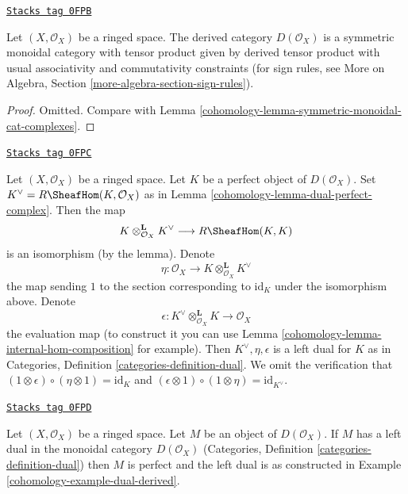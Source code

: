 \begin{lemma}
\label{cohomology-lemma-symmetric-monoidal-derived}
\href{https://stacks.math.columbia.edu/tag/0FPB}{\texttt{Stacks tag 0FPB}}

Let $(X, \mathcal{O}_X)$ be a ringed space. The derived category
$D(\mathcal{O}_X)$ is a symmetric monoidal category with tensor product
given by derived tensor product with usual associativity and
commutativity constraints (for sign rules, see
More on Algebra, Section \ref{more-algebra-section-sign-rules}).
\end{lemma}

\begin{proof}

Omitted. Compare with Lemma \ref{cohomology-lemma-symmetric-monoidal-cat-complexes}.
\end{proof}

\begin{example}
\label{cohomology-example-dual-derived}
\href{https://stacks.math.columbia.edu/tag/0FPC}{\texttt{Stacks tag 0FPC}}

Let $(X, \mathcal{O}_X)$ be a ringed space. Let $K$ be a perfect object
of $D(\mathcal{O}_X)$. Set $K^\vee = R\SheafHom(K, \mathcal{O}_X)$
as in Lemma \ref{cohomology-lemma-dual-perfect-complex}.
Then the map
$$
K \otimes_{\mathcal{O}_X}^\mathbf{L} K^\vee \longrightarrow R\SheafHom(K, K)
$$
is an isomorphism (by the lemma). Denote
$$
\eta :
\mathcal{O}_X
\longrightarrow
K \otimes_{\mathcal{O}_X}^\mathbf{L} K^\vee
$$
the map sending $1$ to the section corresponding to
$\text{id}_K$ under the isomorphism above.
Denote
$$
\epsilon :
K^\vee
\otimes_{\mathcal{O}_X}^\mathbf{L} K
\longrightarrow
\mathcal{O}_X
$$
the evaluation map (to construct it you can use
Lemma \ref{cohomology-lemma-internal-hom-composition} for example). Then
$K^\vee, \eta, \epsilon$ is a left dual for $K$ as in
Categories, Definition \ref{categories-definition-dual}.
We omit the verification that
$(1 \otimes \epsilon) \circ (\eta \otimes 1) = \text{id}_K$
and
$(\epsilon \otimes 1) \circ (1 \otimes \eta) =
\text{id}_{K^\vee}$.
\end{example}

\begin{lemma}
\label{cohomology-lemma-left-dual-derived}
\href{https://stacks.math.columbia.edu/tag/0FPD}{\texttt{Stacks tag 0FPD}}

Let $(X, \mathcal{O}_X)$ be a ringed space. Let $M$ be an object
of $D(\mathcal{O}_X)$. If $M$ has a left dual in the monoidal category
$D(\mathcal{O}_X)$ (Categories, Definition \ref{categories-definition-dual})
then $M$ is perfect and the left dual is as constructed in
Example \ref{cohomology-example-dual-derived}.
\end{lemma}

